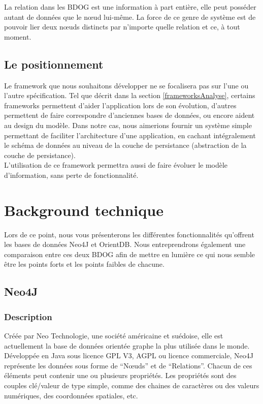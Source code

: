 \documentclass[a4paper,fleqn,12pt,oneside]{book}
\begin{document}
La relation dans les BDOG est une information à part entière, elle peut posséder autant de données que le nœud lui-même.  La force de ce genre de système est de pouvoir lier deux nœuds distincts par n’importe quelle relation et ce, à tout moment\cite{NoSQLVsSGBDR}.

\section{Le positionnement}

\label{positionnement}
Le framework que nous souhaitons développer ne se focalisera pas sur l'une ou l'autre spécification. Tel que décrit dans la section \ref{frameworksAnalyse}, certains frameworks permettent d'aider l'application lors de son évolution, d'autres permettent de faire correspondre d'anciennes bases de données, ou encore aident au design du modèle. Dans notre cas, nous aimerions fournir un système simple permettant de faciliter l'architecture d'une application, en cachant intégralement le schéma de données au niveau de la couche de persistance (abstraction de la couche de persistance). \\L'utilisation de ce framework permettra aussi de faire évoluer le modèle d'information, sans perte de fonctionnalité.


\chapter{Background technique}

Lors de ce point, nous vous présenterons les différentes fonctionnalités qu'offrent les bases de données Neo4J et OrientDB. Nous entreprendrons également une comparaison entre ces deux BDOG afin de mettre en lumière ce qui nous semble être les points  forts et les points faibles de chacune.

\section{Neo4J}

\subsection{Description}

Créée par Neo Technologie, une société américaine et suédoise, elle est actuellement la base de données orientée graphe  la plus utilisée dans le monde\cite{DBEnginesSite}. Développée en Java sous licence GPL V3, AGPL ou licence commerciale, Neo4J représente les données sous forme de \enquote{Nœuds} et de \enquote{Relations}. Chacun de ces éléments peut contenir une ou plusieurs propriétés. Les propriétés sont des couples clé/valeur de type simple, comme des chaines de caractères ou des valeurs numériques, des coordonnées spatiales, etc\cite{Neo4JSite}.
\end{document}

